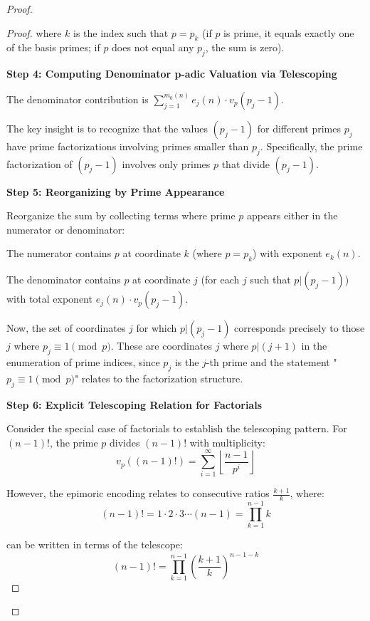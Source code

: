 \begin{proof}
\begin{proof}
where $k$ is the index such that $p = p_k$ (if $p$ is prime, it equals exactly one of the basis primes; if $p$ does not equal any $p_j$, the sum is zero).

\noindent \textbf{Step 4: Computing Denominator p-adic Valuation via Telescoping}

The denominator contribution is $\sum_{j=1}^{m_0(n)} e_j(n) \cdot v_p(p_j - 1)$.

The key insight is to recognize that the values $(p_j - 1)$ for different primes $p_j$ have prime factorizations involving primes smaller than $p_j$. Specifically, the prime factorization of $(p_j - 1)$ involves only primes $p$ that divide $(p_j - 1)$.

\noindent \textbf{Step 5: Reorganizing by Prime Appearance}

Reorganize the sum by collecting terms where prime $p$ appears either in the numerator or denominator:

The numerator contains $p$ at coordinate $k$ (where $p = p_k$) with exponent $e_k(n)$.

The denominator contains $p$ at coordinate $j$ (for each $j$ such that $p | (p_j - 1)$) with total exponent $e_j(n) \cdot v_p(p_j - 1)$.

Now, the set of coordinates $j$ for which $p | (p_j - 1)$ corresponds precisely to those $j$ where $p_j \equiv 1 \pmod{p}$. These are coordinates $j$ where $p | (j+1)$ in the enumeration of prime indices, since $p_j$ is the $j$-th prime and the statement "$p_j \equiv 1 \pmod{p}$" relates to the factorization structure.

\noindent \textbf{Step 6: Explicit Telescoping Relation for Factorials}

Consider the special case of factorials to establish the telescoping pattern. For $(n-1)!$, the prime $p$ divides $(n-1)!$ with multiplicity:
\begin{equation}
v_p((n-1)!) = \sum_{i=1}^{\infty} \left\lfloor \frac{n-1}{p^i} \right\rfloor
\end{equation}

However, the epimoric encoding relates to consecutive ratios $\frac{k+1}{k}$, where:
\begin{equation}
(n-1)! = 1 \cdot 2 \cdot 3 \cdots (n-1) = \prod_{k=1}^{n-1} k
\end{equation}

can be written in terms of the telescope:
\begin{equation}
(n-1)! = \prod_{k=1}^{n-1} \left(\frac{k+1}{k}\right)^{n-1-k}
\end{equation}


\end{proof}
\end{proof}
